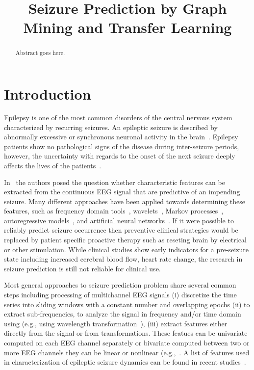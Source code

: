 \documentclass{article} %
\title{Seizure Prediction by Graph Mining and Transfer Learning}
\author{
}
\theoremstyle{definition}
\theoremstyle{remark}
\begin{document}
\maketitle

\begin{abstract}
Abstract goes here.  
\end{abstract}

\section{Introduction}
Epilepsy is one of the most common disorders of the central nervous system characterized by recurring seizures.  An epileptic seizure is described by abnormally excessive or synchronous neuronal activity in the brain~\cite{seizure_def}.  Epilepsy patients show no pathological signs of the disease during inter-seizure periods, however, the uncertainty with regards to the onset of the next seizure deeply affects the lives of the patients~\cite{fisher_impact_epilepsy}.  

In~\cite{mormann_seizure_prediction} the authors posed the question whether characteristic features can be extracted from the continuous EEG signal that are predictive of an impending seizure.  Many different approaches have been applied towards determining these features, such as frequency domain tools~\cite{bronzino_eeg,muthuswamy_spectral}, wavelets~\cite{hazarika_wavelet,murali_wavelet}, Markov processes~\cite{lytton_model_epilepsy}, autoregressive models~\cite{anderson_offline_ar,subasi_EEG_AR,chisci_real_time}, and artificial neural networks~\cite{liu_artificial_neural}.  If it were possible to reliably predict seizure occurrence then preventive clinical strategies would be replaced by patient specific proactive therapy such as reseting brain by electrical or other stimulation.  While clinical studies show early indicators for a pre-seizure state including increased cerebral blood flow, heart rate change, the research in seizure prediction is still not reliable for clinical use.

Most general approaches to seizure prediction problem share several common steps including processing of multichannel EEG signals (i) discretize the time series into sliding windows with a constant number and overlapping epochs (ii) to extract sub-frequencies, to analyze the signal in frequency and/or time domain using (e.g., using wavelength transformation~\cite{acar_seizure_localization}), (iii) extract features either directly from the signal or from transformations.  These featues can be univariate computed on each EEG channel separately or bivariate computed  between two or more EEG channels they can be linear or nonlinear (e.g.,~\cite{mormann2005predictability}.  A list of features used in characterization of epileptic seizure dynamics can be found in recent studies~\cite{paivinen2005epileptic,mormann2005predictability,van2005detecting}.
\end{document}
